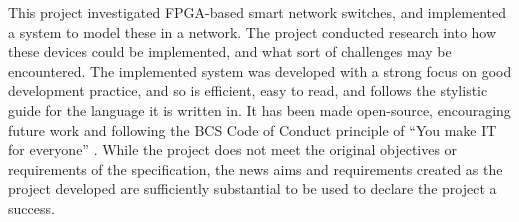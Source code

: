 


This project investigated FPGA-based smart network switches, and implemented a system to model these in a network.
The project conducted research into how these devices could be implemented, and what sort of challenges may be encountered.
The implemented system was developed with a strong focus on good development practice, and so is efficient, easy to read, and follows the stylistic guide for the language it is written in.
It has been made open-source, encouraging future work and following the BCS Code of Conduct principle of ``You make IT for everyone'' \cite{bcs_code_of_conduct}.
While the project does not meet the original objectives or requirements of the specification, the news aims and requirements created as the project developed are sufficiently substantial to be used to declare the project a success.
